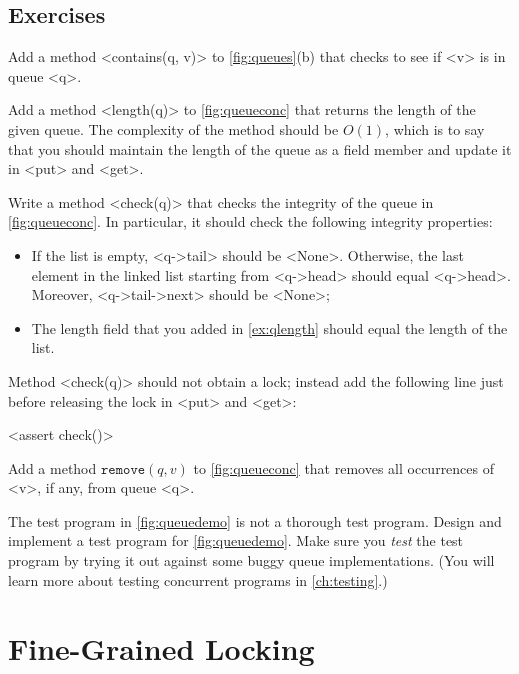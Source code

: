 \documentclass{report}
\newenvironment{code}{
\tcolorbox
}{
\endtcolorbox
}
\begin{document}
\section*{Exercises}
\begin{problems}
\item \label{ex:qcontains} Add a method <{contains(q, v)}> to
\autoref{fig:queues}(b) that checks to see if <{v}> is in queue <{q}>.
\item Add a method <{length(q)}> to \autoref{fig:queueconc} that returns the length of the given queue.
The complexity of the method should be $O(1)$, which is to say that you should maintain
the length of the queue as a field member and update it in <{put}> and <{get}>.
\item \label{ex:qlength} Write a method <{check(q)}>
that checks the integrity of the queue in \autoref{fig:queueconc}.
In particular, it should check the following integrity properties:
\begin{itemize}
\item If the list is empty, <{q->tail}> should be <{None}>.
Otherwise, the last element in the linked list starting from <{q->head}>
should equal <{q->head}>. Moreover,
<{q->tail->next}> should be <{None}>;
\item The length field that you added in \autoref{ex:qlength} should equal the length
of the list.
\end{itemize}
Method <{check(q)}> should not obtain a lock; instead add the following line
just before releasing the lock in <{put}> and <{get}>:
\begin{code}
<{assert check()}>
\end{code}
\item \label{ex:qremove} Add a method $\mathtt{remove}(q, v)$ to \autoref{fig:queueconc}
that removes all occurrences of <{v}>, if any, from queue <{q}>.
\item The test program in \autoref{fig:queuedemo} is not a thorough test program.
Design and implement a test program for \autoref{fig:queuedemo}.
Make sure you \emph{test} the test program by trying it out against some buggy
queue implementations.  (You will learn more about testing concurrent programs in \autoref{ch:testing}.)
\end{problems}

\chapter{Fine-Grained Locking}
\label{ch:finegrained}
\end{document}
